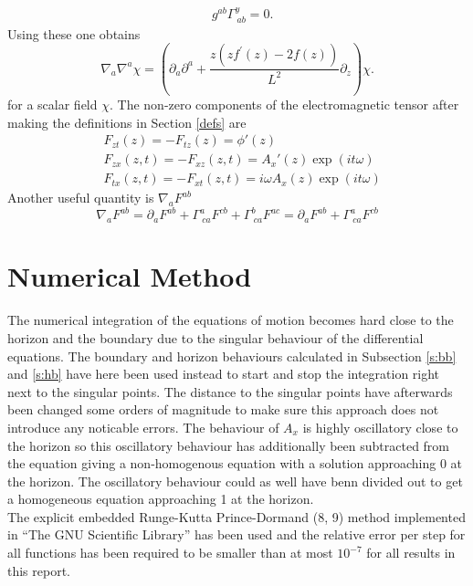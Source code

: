 \documentclass[12pt]{report}
\renewcommand{\i}{\ensuremath{i}}
\newcommand{\At}{\ensuremath{{\phi}}}
\begin{document}
\begin{appendices}
\begin{equation}
\begin{split}
&g^{ab}\Gamma^y_{\ ab}=0.
\end{split}\label{CSsum}
\end{equation}
Using these one obtains
\begin{equation}
 \nabla_a\nabla^a\chi=\left(\partial_a\partial^a+\frac{z \left(z f^\prime\left(z\right) - 2 f\left(z\right)\right)}{L^{2}}\partial_z\right)\chi.
\end{equation}
for a scalar field $\chi$.
The non-zero components of the electromagnetic tensor after making the definitions in Section \ref{defs} are
\begin{equation}
\begin{split}
 &F_{zt}(z)=-F_{tz}(z)=\At'(z)\\
 &F_{zx}(z,t)=-F_{xz}(z,t)=A_x'(z)\exp(\i t \omega)\\
 &F_{tx}(z,t)=-F_{xt}(z,t)=\i\omega A_x(z)\exp(\i t \omega)
\end{split}
\end{equation}
Another useful quantity is
$\nabla_aF^{ab}$
\begin{equation}
 \nabla_aF^{ab}=\partial_aF^{ab}+\Gamma^a_{\ ca}F^{cb}+\Gamma^b_{\ ca}F^{ac}=\partial_aF^{ab}+\Gamma^a_{\ ca}F^{cb}
\end{equation}
\chapter{Numerical Method\label{a:num}}
The numerical integration of the equations of motion becomes hard close to the horizon and the boundary due to the singular behaviour of the differential equations. The boundary and horizon behaviours calculated in Subsection \ref{s:bb} and \ref{s:hb} have here been used instead to start and stop the integration right next to the singular points. The distance to the singular points have afterwards been changed some orders of magnitude to make sure this approach does not introduce any noticable errors. The behaviour of $A_x$ is highly oscillatory close to the horizon so this oscillatory behaviour has additionally been subtracted from the equation giving a non-homogenous equation with a solution approaching 0 at the horizon. The oscillatory behaviour could as well have benn divided out to get a homogeneous equation approaching 1 at the horizon.\\

The explicit embedded Runge-Kutta Prince-Dormand (8, 9) method implemented in ``The GNU Scientific Library'' \cite{gsl} has been used and the relative error per step for all functions has been required to be smaller than at most $10^{-7}$ for all results in this report.

\end{appendices}
\end{document}
